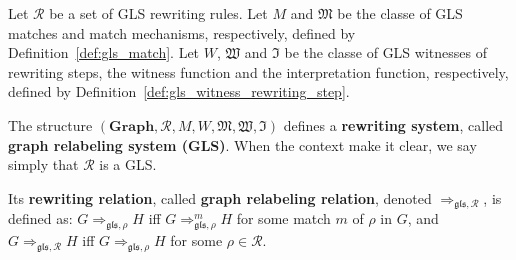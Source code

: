 
\begin{definition}
  Let $\mathcal{R}$ be a set of GLS rewriting rules. Let $M$ and $\mathfrak{M}$ be the classe of GLS matches and match mechanisms, respectively, defined by Definition~\ref{def:gls_match}. Let $W$, $\mathfrak{W}$ and $\mathfrak{I}$
   be the classe of GLS witnesses of rewriting steps, the witness function and the interpretation function, respectively, defined by Definition~\ref{def:gls_witness_rewriting_step}. 

  The structure $(\mathbf{Graph},\mathcal{R},M,W,\mathfrak{M},\mathfrak{W},\mathfrak{I})$ defines a \textbf{rewriting system}, called \textbf{graph relabeling system (GLS)}. When the context make it clear, we say simply that $\mathcal{R}$ is a GLS.

  Its \textbf{rewriting relation}, called \textbf{graph relabeling relation}, denoted $\mathop{\Rightarrow}_{\mathfrak{gls},\mathcal{R}}$, is defined as:  $G  \mathop{\Rightarrow}_{\mathfrak{gls}, \rho} H$ iff $G \mathop{\Rightarrow}^m_{\mathfrak{gls},\rho} H$ for some match $m$ of $\rho$ in $G$, and 
   $G  \mathop{\Rightarrow}_{\mathfrak{gls},\mathcal{R}} H$ iff $G \mathop{\Rightarrow}_{\mathfrak{gls},\rho} H$ for some $\rho \mathop{\in} \mathcal{R}$.
\end{definition}


